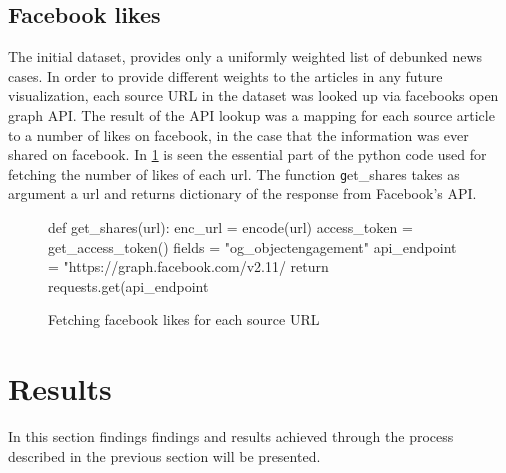 \documentclass{article}
\begin{document}
\subsection{Facebook likes}
The initial dataset, provides only a uniformly weighted list of debunked news cases. In order to provide different weights to the articles in any future visualization, each source URL in the dataset was looked up via facebooks open graph API. The result of the API lookup was a mapping for each source article to a number of likes on facebook, in the case that the information was ever shared on facebook. In \cref{fig:fetch_likes} is seen the essential part of the python code used for fetching the number of likes of each url. The function {\texttt get\_shares} takes as argument a url and returns dictionary of the response from Facebook's API.

\begin{figure}[H]
\caption{Fetching facebook likes for each source URL}
\label{fig:fetch_likes}
\begin{python}
def get_shares(url):
    enc_url = encode(url)
    access_token = get_access_token()
    fields = "og_object{engagement}"
    api_endpoint = "https://graph.facebook.com/v2.11/%
    return requests.get(api_endpoint %
\end{python}
\end{figure}

\section{Results}
In this section findings findings and results achieved through the process described in the previous section will be presented.
\end{document}
